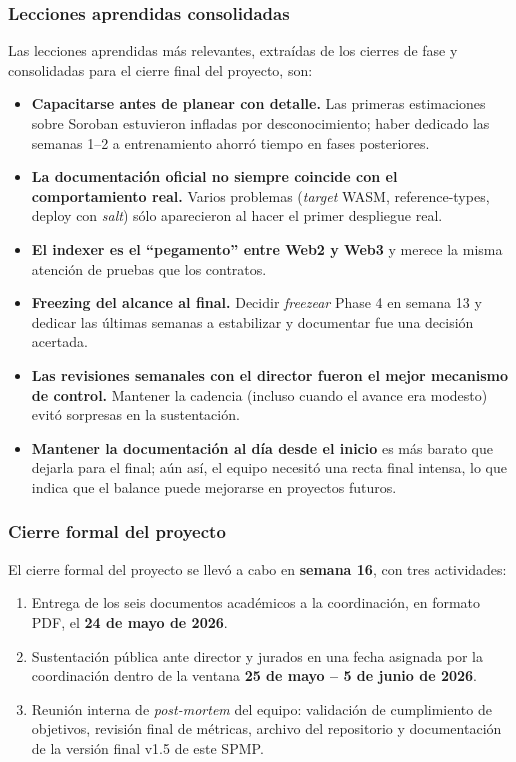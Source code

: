\documentclass[12pt,oneside]{report}
\begin{document}
      \subsubsection{Lecciones aprendidas consolidadas}
      Las lecciones aprendidas más relevantes, extraídas de los cierres de fase y consolidadas para el cierre final del proyecto, son:
      \begin{itemize}
        \item \textbf{Capacitarse antes de planear con detalle.} Las primeras estimaciones sobre Soroban estuvieron infladas por desconocimiento; haber dedicado las semanas 1--2 a entrenamiento ahorró tiempo en fases posteriores.
        \item \textbf{La documentación oficial no siempre coincide con el comportamiento real.} Varios problemas (\textit{target} WASM, reference-types, deploy con \textit{salt}) sólo aparecieron al hacer el primer despliegue real.
        \item \textbf{El indexer es el ``pegamento'' entre Web2 y Web3} y merece la misma atención de pruebas que los contratos.
        \item \textbf{Freezing del alcance al final.} Decidir \textit{freezear} Phase 4 en semana 13 y dedicar las últimas semanas a estabilizar y documentar fue una decisión acertada.
        \item \textbf{Las revisiones semanales con el director fueron el mejor mecanismo de control.} Mantener la cadencia (incluso cuando el avance era modesto) evitó sorpresas en la sustentación.
        \item \textbf{Mantener la documentación al día desde el inicio} es más barato que dejarla para el final; aún así, el equipo necesitó una recta final intensa, lo que indica que el balance puede mejorarse en proyectos futuros.
      \end{itemize}

      \subsubsection{Cierre formal del proyecto}
      El cierre formal del proyecto se llevó a cabo en \textbf{semana 16}, con tres actividades:
      \begin{enumerate}
        \item Entrega de los seis documentos académicos a la coordinación, en formato PDF, el \textbf{24 de mayo de 2026}.
        \item Sustentación pública ante director y jurados en una fecha asignada por la coordinación dentro de la ventana \textbf{25 de mayo -- 5 de junio de 2026}.
        \item Reunión interna de \textit{post-mortem} del equipo: validación de cumplimiento de objetivos, revisión final de métricas, archivo del repositorio y documentación de la versión final v1.5 de este SPMP.
      \end{enumerate}
\end{document}
